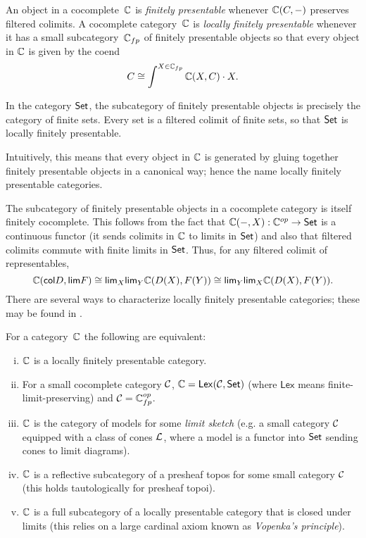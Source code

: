 \begin{definition}%
    \label{def:lfp}
	An object in a cocomplete $\,\mathbb{C}$ is \emph{finitely presentable} whenever $\mathbb{C}(C,-)$ preserves filtered colimits. A cocomplete category $\,\mathbb{C}$ is \emph{locally finitely presentable} whenever it has a small subcategory $\,\mathbb{C}_{fp}$ of finitely presentable objects so that every object in $\mathbb{C}$ is given by the coend
	\[
		C \cong \int^{X \in \mathbb{C}_{fp}} \mathbb{C}(X, C) \cdot X.
	\]
\end{definition}
\begin{example}
	In the category $\mathsf{Set}$, the subcategory of finitely presentable objects is precisely the category of finite sets. 
	Every set is a filtered colimit of finite sets, so that $\mathsf{Set}$ is locally finitely presentable. 
\end{example}
Intuitively, this means that every object in $\mathbb{C}$ is generated by gluing together finitely presentable objects in a canonical way; hence the name locally finitely presentable categories. 

The subcategory of finitely presentable objects in a cocomplete category is itself finitely cocomplete.
This follows from the fact that $\mathbb{C}(-,X):\mathbb{C}^{op} \to \mathsf{Set}$ is a continuous functor (it sends colimits in $\mathbb{C}$ to limits in $\mathsf{Set}$) and also that filtered colimits commute with finite limits in $\mathsf{Set}$.  
Thus, for any filtered colimit of representables,
\[
    \mathbb{C}(\mathsf{col}D, \mathsf{lim}F) \cong \mathsf{lim}_X \mathsf{lim}_Y  \mathbb{C}(D(X),F(Y)) \cong \mathsf{lim}_Y \mathsf{lim}_X  \mathbb{C}(D(X),F(Y)). 
\]
There are several ways to characterize locally finitely presentable categories; these may be found in \cite{Adamek1994}.
\begin{proposition}%
    \label{prop:lfp-defs}
    For a category $\,\mathbb{C}$ the following are equivalent:
    \begin{enumerate}[(i)]
        \item $\mathbb{C}$ is a locally finitely presentable category.
        \item For a small cocomplete category $\mathcal{C}$, $\mathbb{C} = \mathsf{Lex}(\mathcal{C}, \mathsf{Set})$ (where $\mathsf{Lex}$ means finite-limit-preserving) and $\mathcal{C} = \mathbb{C}^{op}_{fp}$.
        \item $\mathbb{C}$ is the category of models for some \emph{limit sketch} (e.g. a small category $\mathcal{C}$ equipped with a class of cones $\mathcal{L}$, where a model is a functor into $\mathsf{Set}$ sending cones to limit diagrams).
        \item $\mathbb{C}$ is a reflective subcategory of a presheaf topos for some small category $\mathcal{C}$ (this holds tautologically for presheaf topoi).
        \item $\mathbb{C}$ is a full subcategory of a locally presentable category that is closed under limits (this relies on a large cardinal axiom known as \emph{Vopenka's principle}).
    \end{enumerate}
\end{proposition}

